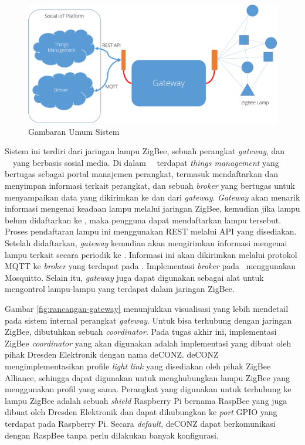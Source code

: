 \begin{figure}
	\centering
	\includegraphics[width=.9\textwidth]{pics/rancangan-sistem.PNG}
	\caption{Gambaran Umum Sistem}
	\label{fig:rancangan-sistem}
\end{figure}

Sistem ini terdiri dari jaringan lampu ZigBee, sebuah perangkat \textit{gateway}, dan \plat~\iot~yang berbasis sosial media. Di dalam \plat~\iot~terdapat \textit{things management} yang bertugas sebagai portal manajemen perangkat, termasuk mendaftarkan dan menyimpan informasi terkait perangkat, dan sebuah \textit{broker} yang bertugas untuk menyampaikan data yang dikirimkan ke dan dari \textit{gateway}. \textit{Gateway} akan menarik informasi mengenai keadaan lampu melalui jaringan ZigBee, kemudian jika lampu belum didaftarkan ke \plat, maka pengguna dapat mendaftarkan lampu tersebut. Proses pendaftaran lampu ini menggunakan REST melalui API yang disediakan. Setelah didaftarkan, \textit{gateway} kemudian akan mengirimkan informasi mengenai lampu terkait secara periodik ke \plat. Informasi ini akan dikirimkan melalui protokol MQTT ke \textit{broker} yang terdapat pada \plat. Implementasi \textit{broker} pada \plat~menggunakan Mosquitto. Selain itu, \textit{gateway} juga dapat digunakan sebagai alat untuk mengontrol lampu-lampu yang terdapat dalam jaringan ZigBee.

Gambar \ref{fig:rancangan-gateway} menunjukkan visualisasi yang lebih mendetail pada sistem internal perangkat \textit{gateway}. Untuk bisa terhubung dengan jaringan ZigBee, dibutuhkan sebuah \textit{coordinator}. Pada tugas akhir ini, implementasi ZigBee \textit{coordinator} yang akan digunakan adalah implementasi yang dibuat oleh pihak Dresden Elektronik dengan nama deCONZ. deCONZ mengimplementasikan profile \textit{light link} yang disediakan oleh pihak ZigBee Alliance, sehingga dapat digunakan untuk menghubungkan lampu ZigBee yang menggunakan profil yang sama. Perangkat yang digunakan untuk terhubung ke lampu ZigBee adalah sebuah \textit{shield} Raspberry Pi bernama RaspBee yang juga dibuat oleh Dresden Elektronik dan dapat dihubungkan ke \textit{port} GPIO yang terdapat pada Raspberry Pi. Secara \textit{default}, deCONZ dapat berkomunikasi dengan RaspBee tanpa perlu dilakukan banyak konfigurasi.

